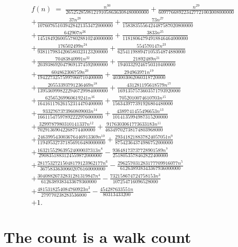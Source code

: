 \documentclass[11pt,a4paper]{article}
\theoremstyle{plain}
\theoremstyle{definition}
\begin{document}
\begin{multline*}
f(n)\;=\;\frac{n^{30}}{265252859812191058636308480000000} + \frac{n^{29}}{609776689223427721003008000000} \\
+ \frac{37 n^{28}}{107607651039428421353472000000} + \frac{73 n^{27}}{1583835556424487587020800000} \\
+ \frac{642907 n^{26}}{145184926005578028810240000000} + \frac{3833 n^{25}}{11818064794918846464000000} \\
+ \frac{176502499 n^{24}}{9381179834206580323123200000} + \frac{554570147 n^{23}}{625411988947105354874880000} \\
+ \frac{70483840991 n^{22}}{2039386920479691374592000000} + \frac{21892489 n^{21}}{19403329246750310400000} \\
+ \frac{604862306759 n^{20}}{19422732575997060710400000} + \frac{294963971 n^{19}}{403003062060318720000} \\
+ \frac{20553393791236469 n^{18}}{1395369998222946729984000000} + \frac{431281195618579 n^{17}}{1691357573603571793920000} \\
+ \frac{62565269960619241 n^{16}}{16416117626152314470400000} + \frac{7052010074610703 n^{15}}{156343977391926804480000} \\
+ \frac{9332767373960809003 n^{14}}{16611547597892222976000000} + \frac{4389741455496653 n^{13}}{1014135994987315200000} \\
+ \frac{3299787980310141337 n^{12}}{70291369042268774400000} + \frac{9176303061773633183 n^{11}}{46349702738174803968000} \\
+ \frac{246399543003676446913369 n^{10}}{119495327371856916480000000} + \frac{293418218837824057051 n^{9}}{87542364374986752000000} \\
+ \frac{163215529639524000037313 n^{8}}{2908351883124559872000000} - \frac{93648173737728901589 n^{7}}{2518053578462822400000} \\
+ \frac{28175327215048179123962177 n^{6}}{36758336300602076160000000} - \frac{296257031283177709916077 n^{5}}{612638938343367936000000} \\
+ \frac{30408826732831281319847 n^{4}}{6126389383433679360000} - \frac{732158674724758153 n^{3}}{107254716096528000} \\
+ \frac{4815318254084760923 n^{2}}{279770238283536000} - \frac{454287633551 n}{80313433200} \\
+ 1.
\end{multline*}

\section{The count is a walk count}
\end{document}
